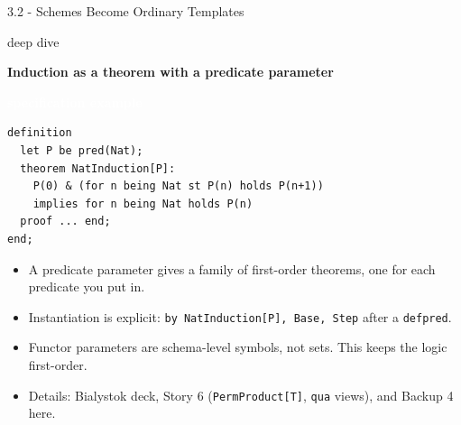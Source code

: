 \documentclass[aspectratio=169,11pt]{beamer}
\newcommand{\statusbadge}[2]{\colorbox{#1}{\textcolor{white}{\strut\scriptsize\sffamily\bfseries #2}}}
\newcommand{\badgeSpec}{\statusbadge{green!35!black}{specification example}}
\newcommand{\deepdivetag}{\hfill\colorbox{black!15}{\textcolor{black!65}{\strut\scriptsize\sffamily deep dive}}}
\begin{document}
\begin{frame}[fragile,t]{3.2 - Schemes Become Ordinary Templates\deepdivetag}
\smallskip
\textbf{Induction as a theorem with a predicate parameter}~\badgeSpec
\begin{lstlisting}[language={mizar},basicstyle=\ttfamily\small]
definition
  let P be pred(Nat);
  theorem NatInduction[P]:
    P(0) & (for n being Nat st P(n) holds P(n+1))
    implies for n being Nat holds P(n)
  proof ... end;
end;
\end{lstlisting}
\begin{itemize}
\setlength{\itemsep}{1pt}
\setlength{\parsep}{0pt}
\setlength{\parskip}{0pt}
\item A predicate parameter gives a family of first-order theorems, one for each predicate you put in.
\item Instantiation is explicit: \texttt{by NatInduction[P], Base, Step} after a \texttt{defpred}.
\item Functor parameters are schema-level symbols, not sets. This keeps the logic first-order.
\item Details: Bialystok deck, Story 6 (\texttt{PermProduct[T]}, \texttt{qua} views), and Backup 4 here.
\end{itemize}
\end{frame}
\end{document}
